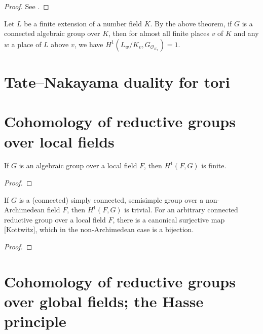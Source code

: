 \begin{proof}
See \cite[Theorem 6.8]{Platonov-Rapinchuk}.
\end{proof}

\begin{remark}
\label{remark-trivial-almost-everywhere}
Let $L$ be a finite extension of a number field $K$. By the above theorem, if $G$ is a connected algebraic group over $K$, then for almost all finite places $v$ of $K$ and any $w$ a place of $L$ above $v$, we have $H^{1}(L_{w}/K_{v}, G_{\mathcal{O}_{K_{v}}})=1$. 
\end{remark}



\section{Tate--Nakayama duality for tori}
 \label{section-Tate-Nakayama}
 

\section{Cohomology of reductive groups over local fields}
\label{section-local-fields}

\begin{lemma}
 \label{lemma-cohomology-finite}
If $G$ is an algebraic group over a local field $F$, then $H^1(F, G)$ is finite.
\end{lemma}

\begin{proof}
 
\end{proof}


\begin{theorem}
 \label{theorem-H1-trivial}
If $G$ is a (connected) simply connected, semisimple group over a non-Archimedean field $F$, then $H^1(F,G)$ is trivial. For an arbitrary connected reductive group over a local field $F$, there is a canonical surjective map [Kottwitz], which in the non-Archimedean case is a bijection.
\end{theorem}

\begin{proof}
 
\end{proof}

\section{Cohomology of reductive groups over global fields; the Hasse principle}
\label{section-global-fields}


